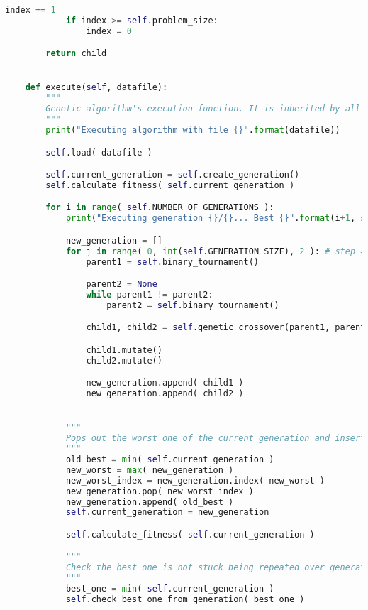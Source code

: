 \begin{lstlisting}[language=python]
            index += 1
            if index >= self.problem_size:
                index = 0

        return child


    def execute(self, datafile):
        """
        Genetic algorithm's execution function. It is inherited by all its children, which will overload the default 'calculate_fitness' function.
        """
        print("Executing algorithm with file {}".format(datafile))

        self.load( datafile )

        self.current_generation = self.create_generation()
        self.calculate_fitness( self.current_generation )

        for i in range( self.NUMBER_OF_GENERATIONS ):
            print("Executing generation {}/{}... Best {}".format(i+1, self.NUMBER_OF_GENERATIONS, self.last_best_one.fitness), end="\r")

            new_generation = []
            for j in range( 0, int(self.GENERATION_SIZE), 2 ): # step = 2
                parent1 = self.binary_tournament()

                parent2 = None
                while parent1 != parent2:
                    parent2 = self.binary_tournament()

                child1, child2 = self.genetic_crossover(parent1, parent2)

                child1.mutate()
                child2.mutate()

                new_generation.append( child1 )
                new_generation.append( child2 )


            """
            Pops out the worst one of the current generation and inserts in its place the best one of the previous generation
            """
            old_best = min( self.current_generation )
            new_worst = max( new_generation )
            new_worst_index = new_generation.index( new_worst )
            new_generation.pop( new_worst_index )
            new_generation.append( old_best )
            self.current_generation = new_generation

            self.calculate_fitness( self.current_generation )

            """
            Check the best one is not stuck being repeated over generations. Otherwise, reinitialise the population keeping the best one
            """
            best_one = min( self.current_generation )
            self.check_best_one_from_generation( best_one )


\end{lstlisting}

